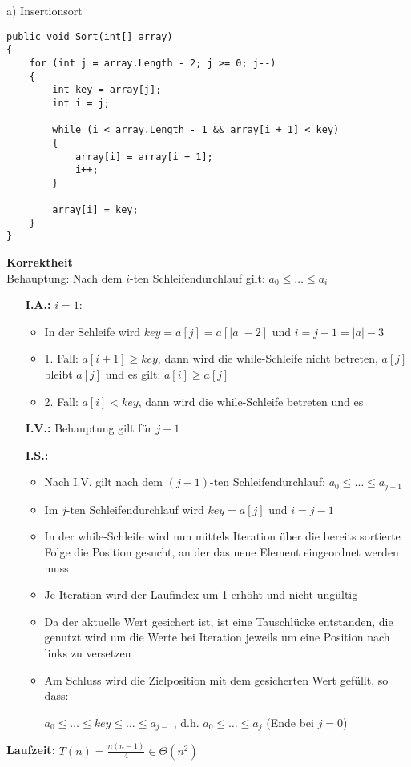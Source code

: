 a) Insertionsort \\[0.5cm]

\begin{verbatim}
public void Sort(int[] array)
{
    for (int j = array.Length - 2; j >= 0; j--)
    {
        int key = array[j];
        int i = j;

        while (i < array.Length - 1 && array[i + 1] < key)
        {
            array[i] = array[i + 1];
            i++;
        }

        array[i] = key;
    }
}
\end{verbatim}

\textbf{Korrektheit} \\

Behauptung: Nach dem $i$-ten Schleifendurchlauf gilt: $a_0 \leq \dots \leq a_i$
\begin{itemize}[noitemsep]
    \item[\textbf{I.A.:}] $i = 1$: 
    \item[] \begin{itemize}[nolistsep, noitemsep]
    	\item In der Schleife wird $key = a[j] = a[|a| - 2]$ und $i = j - 1 = |a| - 3$
        \item 1. Fall: $a[i + 1] \geq key$, dann wird die while-Schleife nicht betreten, $a[j]$ bleibt $a[j]$ und es gilt: $a[i] \geq a[j]$
        \item 2. Fall: $a[i] < key$, dann wird die while-Schleife betreten und es 
    \end{itemize}
    \item[\textbf{I.V.:}] Behauptung gilt für $j - 1$
    \item[\textbf{I.S.:}] 
    \item[] \begin{itemize}[nolistsep, noitemsep]
    	\item Nach I.V. gilt nach dem $(j - 1)$-ten Schleifendurchlauf: $a_0 \leq \dots \leq a_{j - 1}$
        \item Im $j$-ten Schleifendurchlauf wird $key = a[j]$ und $i = j - 1$
        \item In der while-Schleife wird nun mittels Iteration über die bereits sortierte Folge die Position gesucht, an der das neue Element eingeordnet werden muss
        \item Je Iteration wird der Laufindex um 1 erhöht und nicht ungültig
        \item Da der aktuelle Wert gesichert ist, ist eine Tauschlücke entstanden, die genutzt wird um die Werte bei Iteration jeweils um eine Position nach links zu versetzen
        \item Am Schluss wird die Zielposition mit dem gesicherten Wert gefüllt, so dass: 
        \item[] $a_0 \leq \dots \leq key \leq \dots \leq a_{j - 1}$, d.h. $a_0 \leq \dots \leq a_j$ (Ende bei $j = 0$)
    \end{itemize}
\end{itemize}

\nuffsaid

\textbf{Laufzeit:} $T(n) = \frac{n(n - 1)}{4} \in \Theta(n^2)$